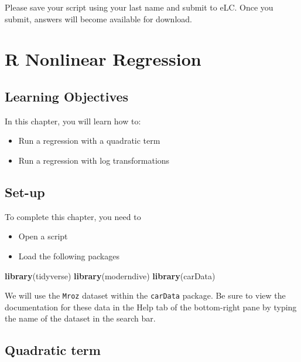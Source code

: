 \documentclass[
]{book}
\newenvironment{Shaded}{\begin{snugshade}}{\end{snugshade}}
\newcommand{\KeywordTok}[1]{\textcolor[rgb]{0.13,0.29,0.53}{\textbf{#1}}}
\newcommand{\NormalTok}[1]{#1}
\providecommand{\tightlist}{%
  \setlength{\itemsep}{0pt}\setlength{\parskip}{0pt}}
\begin{document}
Please save your script using your last name and submit to eLC. Once you submit, answers will become available for download.

\hypertarget{r-nonlinear-regression}{%
\chapter{R Nonlinear Regression}\label{r-nonlinear-regression}}

\hypertarget{learning-objectives}{%
\section{Learning Objectives}\label{learning-objectives}}

In this chapter, you will learn how to:

\begin{itemize}
\tightlist
\item
  Run a regression with a quadratic term
\item
  Run a regression with log transformations
\end{itemize}

\hypertarget{set-up}{%
\section{Set-up}\label{set-up}}

To complete this chapter, you need to

\begin{itemize}
\tightlist
\item
  Open a script
\item
  Load the following packages
\end{itemize}

\begin{Shaded}
\begin{Highlighting}[]
\KeywordTok{library}\NormalTok{(tidyverse)}
\KeywordTok{library}\NormalTok{(moderndive)}
\KeywordTok{library}\NormalTok{(carData)}
\end{Highlighting}
\end{Shaded}

We will use the \texttt{Mroz} dataset within the \texttt{carData} package. Be sure to view the documentation for these data in the Help tab of the bottom-right pane by typing the name of the dataset in the search bar.

\hypertarget{quadratic-term}{%
\section{Quadratic term}\label{quadratic-term}}
\end{document}
